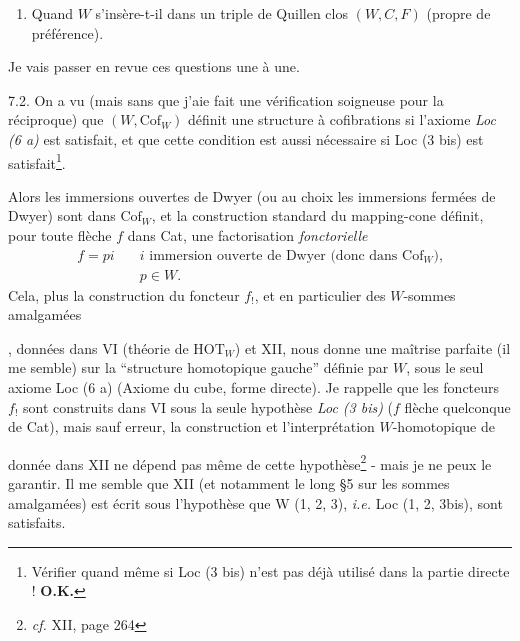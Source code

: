 \documentclass[11pt]{article}
\newcommand{\msp}[1]{\marginpar{\footnotesize [#1]}}
\begin{document}
\begin{enumerate}[label=1 bis)]
\item Quand $W$ s'insère-t-il dans un triple de Quillen clos $(W,C,F)$ (propre de préférence).
\end{enumerate}

Je vais passer en revue ces questions une à une.

7.2. On a vu (mais sans que j'aie fait une vérification soigneuse pour la réciproque) que $(W,\mathrm{Cof}_W)$ définit une structure à cofibrations si l'axiome \textit{Loc (6 a)} est satisfait, et que cette condition est aussi nécessaire si Loc (3 bis) est satisfait\footnote[45]{Vérifier quand même si Loc (3 bis) n'est pas déjà utilisé dans la partie directe ! \textbf{O.K.}}.

\msp{page 99}
Alors les immersions ouvertes de Dwyer (ou au choix les immersions fermées de Dwyer) sont dans $\mathrm{Cof}_W$, et la construction standard du mapping-cone définit, pour toute flèche $f$ dans Cat, une factorisation \textit{fonctorielle}
\[
\begin{aligned}
f = pi \quad & i \text{ immersion ouverte de Dwyer (donc dans } \mathrm{Cof}_W\text{),}\\
& p \in W.
\end{aligned}
\]
Cela, plus la construction du foncteur $f_!$, et en particulier des $W$-sommes amalgamées
, données dans VI (théorie de $\mathrm{HOT}_W$) et XII, nous donne une maîtrise parfaite (il me semble) sur la “structure homotopique gauche” définie par $W$, sous le seul axiome Loc (6 a) (Axiome du cube, forme directe). Je rappelle que les foncteurs $f_!$ sont construits dans VI sous la seule hypothèse \textit{Loc (3 bis)} ($f$ flèche quelconque de Cat), mais sauf erreur, la construction
\msp{page 100}
et l'interprétation $W$-homotopique de
donnée dans XII ne dépend pas même de cette hypothèse\footnote[46]{\textit{cf.} XII, page 264} - mais je ne peux le garantir. Il me semble que XII (et notamment le long §5 sur les sommes amalgamées) est écrit sous l'hypothèse que W (1, 2, 3), \textit{i.e.} Loc (1, 2, 3bis), sont satisfaits.
\end{document}
